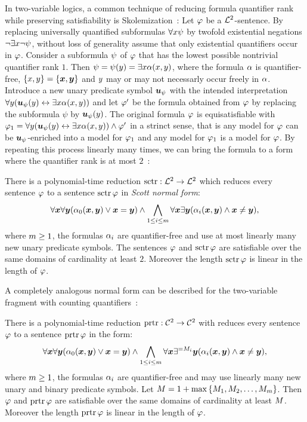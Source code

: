 In two-variable logics, a common technique of reducing formula quantifier rank
while preserving satisfiability is Skolemization~\cite{gradel1999logics}:
Let $\varphi$ be a $\mathcal{L}^{2}$-sentence.
By replacing universally quantified subformulas $\forall x \psi$ by twofold
existential negations $\lnot\exists x \lnot\psi$, without loss of generality
assume that only existential quantifiers occur in $\varphi$.
Consider a subformula $\psi$ of $\varphi$ that has the lowest possible nontrivial
quantifier rank $1$.
Then $\psi = \psi(y) = \exists x \alpha(x,y)$, where the formula
$\alpha$ is quantifier-free, $\left\{x,y\right\} = \left\{\bm{x},\bm{y}\right\}$ and $y$ may
or may not necessarly occur freely in $\alpha$.
Introduce a new unary predicate symbol $\bm{u}_{\psi}$ with the intended
interpretation $\forall y(\bm{u}_{\psi}(y) \leftrightarrow \exists x \alpha(x,y))$ and
let ${\varphi'}$ be the formula obtained from $\varphi$ by replacing the subformula
$\psi$ by $\bm{u}_{\psi}(y)$.
The original formula $\varphi$ is equisatisfiable with
$\varphi_1 = \forall y(\bm{u}_{\psi}(y) \leftrightarrow \exists x \alpha(x,y)) \land
{\varphi'}$ in a strinct sense, that is any model for $\varphi$ can be
$\bm{u}_{\psi}$-enriched into a model for $\varphi_1$ and any model for $\varphi_1$ is a
model for $\varphi$.
By repeating this process linearly many times, we can bring the formula to a
form where the quantifier rank is at most 
$2$~\cite{scott1962decision,gradel1999logics}:
\begin{theorem}[Scott]
There is a polynomial-time reduction $\operatorname{sctr}: \mathcal{L}^{2} \to \mathcal{L}^{2}$ which reduces
every sentence $\varphi$ to a sentence $\operatorname{sctr}\varphi$ in \emph{Scott normal form}:
\[
  \forall\bm{x}\forall\bm{y}(\alpha_{0}(\bm{x},\bm{y}) \lor \bm{x} = \bm{y}) \land
  \bigwedge_{1 \leq i \leq m} \forall\bm{x}\exists\bm{y}
  (\alpha_{i}(\bm{x},\bm{y}) \land \bm{x} \neq \bm{y}),
\]
where $m\geq1$, the formulas $\alpha_{i}$ are quantifier-free and use at most
linearly many new unary predicate symbols. The sentences $\varphi$ and $\operatorname{sctr}\varphi$ are
satisfiable over the same domains of cardinality at least $2$.
Moreover the length $\operatorname{sctr}\varphi$ is linear in the length of $\varphi$.
\end{theorem}

A completely analogous normal form can be described for the two-variable
fragment with counting quantifiers~\cite{MALQ:MALQ201400102}:
\begin{theorem}
There is a polynomial-time reduction $\operatorname{prtr}: \mathcal{C}^{2} \to \mathcal{C}^{2}$ with reduces
every sentence $\varphi$ to a sentence $\operatorname{prtr}\varphi$ in the form:
\[
  \forall\bm{x}\forall\bm{y}(\alpha_{0}(\bm{x},\bm{y}) \lor \bm{x}=\bm{y}) \land
  \bigwedge_{1 \leq i \leq m} \forall\bm{x}\exists^{=M_{i}}\bm{y}
  (\alpha_{i}(\bm{x},\bm{y}) \land \bm{x}\neq\bm{y}),
\]
where $m\geq1$, the formulas $\alpha_{i}$ are quantifier-free and may use
linearly many new unary and binary predicate symbols. Let $M =
1+\max\left\{M_{1},M_{2},\dots,M_{m}\right\}$.
Then $\varphi$ and $\operatorname{prtr}\varphi$ are satisfiable over the same domains of
cardinality at least $M$.
Moreover the length $\operatorname{prtr}\varphi$ is linear in the length of $\varphi$.
\end{theorem}
